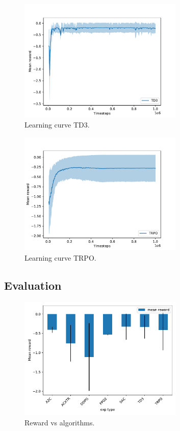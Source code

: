 \documentclass{article}
\begin{document}
\begin{figure}[H]
    \centering
    \includegraphics[width=0.7\textwidth]{../TD3.pdf}
\caption{Learning curve TD3.}
\end{figure}

\begin{figure}[H]
    \centering
    \includegraphics[width=0.7\textwidth]{../TRPO.pdf}
\caption{Learning curve TRPO.}
\end{figure}



\subsection{Evaluation}


\begin{figure}[H]
    \centering
    \includegraphics[width=0.7\textwidth]{../reward_by_exp_type.pdf}
\caption{Reward vs algorithms.}
\end{figure}
\end{document}
